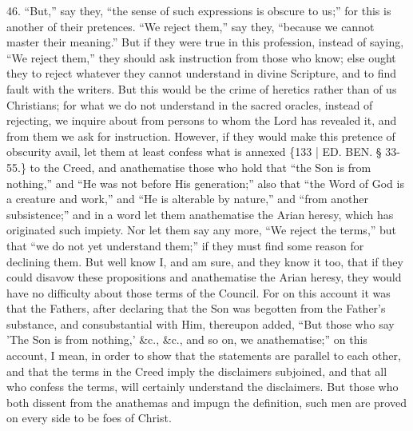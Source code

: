 46. ``But,'' say they, ``the
sense of such expressions is obscure to us;'' for this is another of
their pretences. ``We reject them,'' say they, ``because we cannot master
their meaning.'' But if they were true in this profession, instead of
saying, ``We reject them,'' they should ask instruction from those who
know; else ought they to reject whatever they cannot understand in
divine Scripture, and to find fault with the writers. But this would
be the crime of heretics rather than of us Christians; for what we do
not understand in the sacred oracles, instead of rejecting, we inquire
about from persons to whom the Lord has revealed it, and from them we
ask for instruction. However, if they would make this pretence of
obscurity avail, let them at least confess what is annexed \{133 | ED.
BEN.
§ 33-55.\} to the Creed, and anathematise those who hold that ``the Son
is from nothing,'' and ``He was not before His generation;'' also that ``the
Word of God is a creature and work,'' and ``He is alterable by nature,''
and ``from another subsistence;'' and in a word let them anathematise
the Arian heresy, which has originated such impiety. Nor let them say
any more, ``We reject the terms,'' but that ``we do not yet understand
them;'' if they must find some reason for declining them. But well know
I, and am sure, and they know it too, that if they could disavow these
propositions and anathematise the Arian heresy, they would have no
difficulty about those terms of the Council. For on this account it
was that the Fathers, after declaring that the Son was begotten from
the Father's substance, and consubstantial with Him, thereupon added, ``But
those who say 'The Son is from nothing,' \&c., \&c., and so on,
we anathematise;'' on this account, I mean, in order to show that the
statements are parallel to each other, and that the terms in the Creed
imply the disclaimers subjoined, and that all who confess the terms,
will certainly understand the disclaimers. But those who both dissent
from the anathemas and impugn the definition, such men are proved on
every side to be foes of Christ.


